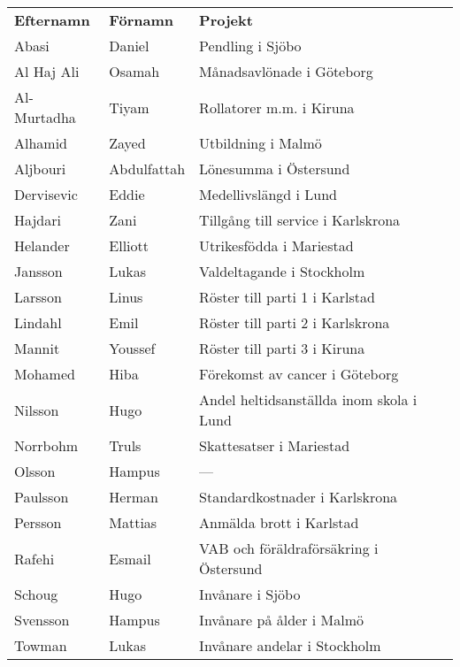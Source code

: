 \documentclass{article}
\begin{document}
\begin{center}
	\begin{tabular}{lll}
		\rowcolor{blue!25}
		\textbf{Efternamn} & \textbf{Förnamn} & \textbf{Projekt}\\
		Abasi & Daniel & Pendling i Sjöbo\\
		Al Haj Ali & Osamah & Månadsavlönade i Göteborg\\
		Al-Murtadha & Tiyam & Rollatorer m.m. i Kiruna\\
		Alhamid & Zayed & Utbildning i Malmö\\
		Aljbouri & Abdulfattah & Lönesumma i Östersund\\
		Dervisevic & Eddie & Medellivslängd i Lund\\
		Hajdari & Zani & Tillgång till service i Karlskrona\\
		Helander & Elliott & Utrikesfödda i Mariestad\\
		Jansson & Lukas  & Valdeltagande i Stockholm\\
		Larsson & Linus & Röster till parti 1 i Karlstad\\
		Lindahl & Emil & Röster till parti 2 i Karlskrona\\
		Mannit & Youssef & Röster till parti 3 i Kiruna\\
		Mohamed & Hiba & Förekomst av cancer i Göteborg\\
		Nilsson & Hugo & Andel heltidsanställda inom skola i Lund\\
		Norrbohm & Truls & Skattesatser i Mariestad\\
		Olsson & Hampus & ---\\
		Paulsson & Herman & Standardkostnader i Karlskrona\\
		Persson & Mattias & Anmälda brott i Karlstad\\
		Rafehi & Esmail & VAB och föräldraförsäkring i Östersund\\
		Schoug & Hugo & Invånare i Sjöbo\\
		Svensson & Hampus & Invånare på ålder i Malmö\\
		Towman & Lukas & Invånare andelar i Stockholm\\
	\end{tabular}
\end{center}

\clearpage






















\end{document}
